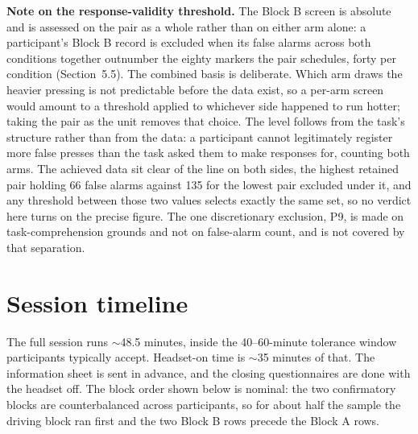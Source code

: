 \textbf{Note on the response-validity threshold.} The Block B screen is absolute and is assessed on
the pair as a whole rather than on either arm alone: a participant's Block B record is excluded when
its false alarms across both conditions together outnumber the eighty markers the pair schedules,
forty per condition (Section~5.5). The combined basis is deliberate. Which arm draws the heavier
pressing is not predictable before the data exist, so a per-arm screen would amount to a threshold
applied to whichever side happened to run hotter; taking the pair as the unit removes that choice.
The level follows from the task's structure rather than from the data: a participant cannot
legitimately register more false presses than the task asked them to make responses for, counting
both arms. The achieved data sit clear of the line on both sides, the highest retained pair holding
66 false alarms against 135 for the lowest pair excluded under it, and any threshold between those
two values selects exactly the same set, so no verdict here turns on the precise figure. The one
discretionary exclusion, P9, is made on task-comprehension grounds and not on false-alarm count, and
is not covered by that separation.


\section{Session timeline}

The full session runs $\sim$48.5 minutes, inside the 40–60-minute tolerance window participants
typically accept. Headset-on time is $\sim$35 minutes of that. The information sheet is sent in
advance, and the closing questionnaires are done with the headset off. The block order shown below is
nominal: the two confirmatory blocks are counterbalanced across participants, so for about half the
sample the driving block ran first and the two Block B rows precede the Block A rows.

